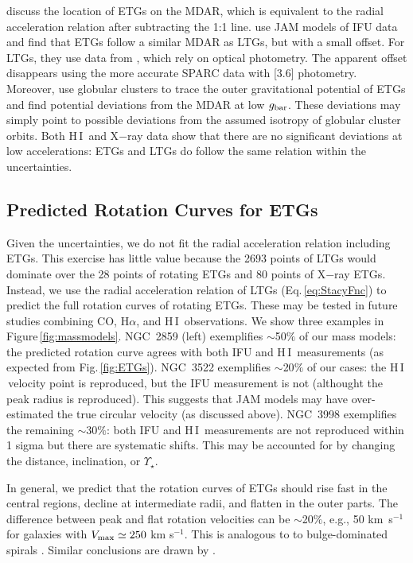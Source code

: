 \documentclass[apjl, twocolappendix]{emulateapj}
\newcommand{\hi } {{\rm H}\,{\small\rm I} \,}
\begin{document}
\citet{Janz2016} discuss the location of ETGs on the MDAR, which is equivalent to the radial acceleration relation after subtracting the 1:1 line. \citet{Janz2016} use JAM models of IFU data and find that ETGs follow a similar MDAR as LTGs, but with a small offset. For LTGs, they use data from \citet{McGaugh2004}, which rely on optical photometry. The apparent offset disappears using the more accurate SPARC data with [3.6] photometry. Moreover, \citet{Janz2016} use globular clusters to trace the outer gravitational potential of ETGs and find potential deviations from the MDAR at low $g_{\rm bar}$. These deviations may simply point to possible deviations from the assumed isotropy of globular cluster orbits. Both \hi and X$-$ray data show that there are no significant deviations at low accelerations: ETGs and LTGs do follow the same relation within the uncertainties.


\subsection{Predicted Rotation Curves for ETGs}

Given the uncertainties, we do not fit the radial acceleration relation including ETGs. This exercise has little value because the 2693 points of LTGs would dominate over the 28 points of rotating ETGs and 80 points of X$-$ray ETGs. Instead, we use the radial acceleration relation of LTGs (Eq.\,\ref{eq:StacyFnc}) to predict the full rotation curves of rotating ETGs. These may be tested in future studies combining CO, H$\alpha$, and \hi observations. We show three examples in Figure\,\ref{fig:massmodels}. NGC~2859 (left) exemplifies $\sim$50$\%$ of our mass models: the predicted rotation curve agrees with both IFU and \hi measurements (as expected from Fig.\,\ref{fig:ETGs}). NGC~3522 exemplifies $\sim$20$\%$ of our cases: the \hi velocity point is reproduced, but the IFU measurement is not (althought the peak radius is reproduced). This suggests that JAM models may have over-estimated the true circular velocity (as discussed above). NGC~3998 exemplifies the remaining $\sim$30$\%$: both IFU and \hi measurements are not reproduced within 1 sigma but there are systematic shifts. This may be accounted for by changing the distance, inclination, or $\Upsilon_{\star}$. 

In general, we predict that the rotation curves of ETGs should rise fast in the central regions, decline at intermediate radii, and flatten in the outer parts. The difference between peak and flat rotation velocities can be $\sim$20$\%$, e.g., 50 km~s$^{-1}$ for galaxies with $V_{\rm max}\simeq 250$ km s$^{-1}$. This is analogous to to bulge-dominated spirals \citep{Casertano1991, Noordermeer2007a}. Similar conclusions are drawn by \citet{Serra2016}.
\end{document}
